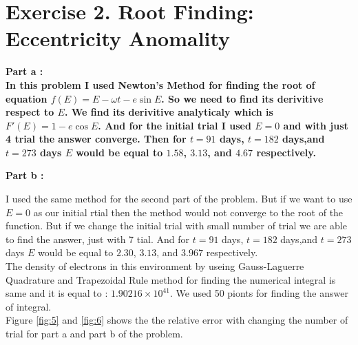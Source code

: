 \documentclass[10pt]{article}
\begin{document}
\pagebreak

\section{Exercise 2. Root Finding: Eccentricity Anomality}

\bfseries{Part a : } \\ \mdseries
In this problem I used Newton’s Method for finding the root of equation $f(E) = E - \omega t - e \sin E$. So we need to find its derivitive respect to $E$. We find its derivitive analyticaly which is $F'(E) = 1 - e \cos E$. And for the initial trial I used  $E = 0$ and with just 4 trial the answer converge. Then for $t = 91$ days, $t = 182$ days,and $t = 273$ days $E$ would be equal to $1.58$, $3.13$, and $4.67$ respectively.

\bfseries{Part b :}\\ \mdseries

I used the same method for the second part of the problem. But if we want to use $E = 0$ as our initial rtial then the method would not converge to the root of the function. But if we change the initial trial with small number of trial we are able to find the answer, just with 7 tial. And for $t = 91$ days, $t = 182$ days,and $t = 273$ days $E$ would be equal to $2.30$, $3.13$, and $3.967$ respectively.\\

 The density of electrons in this environment by useing Gauss-Laguerre Quadrature and Trapezoidal Rule method for finding the numerical integral is same and it is equal to : $1.90216 \times 10^{41}$. We used 50 pionts for finding the answer of integral.\\

Figure \ref{fig:5} and \ref{fig:6} shows the the relative error with changing the number of trial for part a and part b of the problem. 
\end{document}
